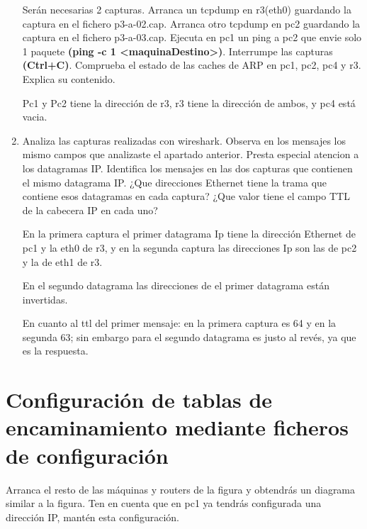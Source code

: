 \documentclass[12pt, a4paper]{report}
\begin{document}
\begin{enumerate}
		Serán necesarias 2 capturas.
		\newline
		Arranca un tcpdump en r3(eth0) guardando la captura en el fichero \color{blue}p3-a-02.cap.\color{black}
		\newline
		Arranca otro tcpdump en pc2 guardando la captura en el fichero \color{blue}p3-a-03.cap.\color{black}
		\newline
		Ejecuta en pc1 un ping a pc2 que envie solo 1 paquete \textbf{(ping -c 1 \textless maquinaDestino\textgreater)}.
		\newline
		Interrumpe las capturas \textbf{(Ctrl+C)}.
		\newline
		Comprueba el estado de las caches de ARP en pc1, pc2, pc4 y r3. Explica su contenido.
		
		Pc1 y Pc2 tiene la dirección de r3, r3 tiene la dirección de ambos, y pc4 está vacia.
	\item Analiza las capturas realizadas con wireshark. Observa en los mensajes los mismo campos que analizaste el apartado anterior. Presta especial atencion a los datagramas IP. Identifica los mensajes en las dos capturas
	que contienen el mismo datagrama IP.  ¿Que direcciones Ethernet tiene la trama que contiene esos datagramas
	en cada captura?  ¿Que valor tiene el campo TTL de la cabecera IP en cada uno?
	
	En la primera captura el primer datagrama Ip tiene la dirección Ethernet de pc1 y la eth0 de r3, y en la segunda captura las direcciones Ip son las de pc2 y la de eth1 de r3.
	
	En el segundo datagrama las direcciones de el primer datagrama están invertidas.
	
	En cuanto al ttl del primer mensaje: en la primera captura es 64 y en la segunda 63; sin embargo para el segundo datagrama es justo al revés, ya que es la respuesta.
\end{enumerate}
\chapter{Configuración de tablas de encaminamiento mediante ficheros de configuración}

Arranca el resto de las máquinas y routers de la figura y obtendrás un diagrama similar a la figura. Ten en
cuenta que en
pc1
ya tendrás configurada una dirección IP, mantén esta configuración.
\newline
\end{document}
